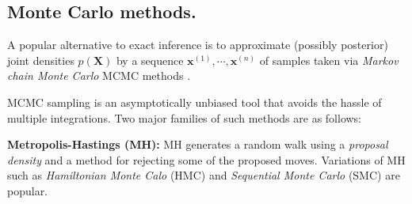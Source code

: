 \documentclass[]{article}
\newcommand{\bvec}[1]{\textbf{#1}}
\newcommand{\pr}{p}
\begin{document}
\subsection{Monte Carlo methods.}
A popular alternative to exact inference is to approximate (possibly posterior) joint densities $\pr(\bvec{X})$ 
by a sequence $\bvec{x}^{(1)}, \cdots, \bvec{x}^{(n)}$ of samples taken
 via \emph{Markov chain Monte Carlo} MCMC methods \citep{koller2009probabilistic}.  


MCMC sampling is an asymptotically unbiased tool that avoids the hassle of multiple integrations. %
Two major families of such methods are as follows:


{\bf Metropolis-Hastings (MH):}
MH \citep{metropolis1953equation} generates a random walk using a \emph{proposal density} and a method for rejecting some of the proposed moves.
Variations of MH such as \emph{Hamiltonian Monte Calo} (HMC) \citep{neal2011mcmc}  
and \emph{Sequential Monte Carlo} (SMC) \citep{del2006sequential} are popular. 


\end{document}
